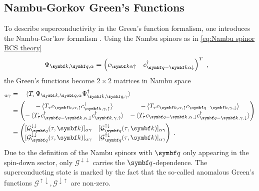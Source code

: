 \documentclass[../main.tex]{subfiles}
\begin{document}
\subsection*{Nambu-Gorkov Green's Functions}

To describe superconductivity in the Green's function formalism, one introduces the Nambu-Gor'kov formalism \cite{georgesDynamicalMeanfieldTheory1996}.
Using the Nambu spinors as in \cref{eq:Nambu spinor BCS theory}
\begin{align}
	\Psi_{\vb{k}, \vb{q}, \alpha} &= 
	\begin{pmatrix}
		c_{\vb{k} \alpha \uparrow} & 
		c_{\vb{q} -\vb{k} \alpha \downarrow}^{\dagger}
	\end{pmatrix}^{T} \;,
\end{align}
the Green's functions become \(2 \times 2\) matrices in Nambu space
\begin{align}
	[\mathcal{G}_{\vb{q}} (\tau, \vb{k})]_{\alpha \gamma} &= -\braket{T_{\tau} \Psi_{\vb{k}, \vb{q}, \alpha} \Psi_{\vb{k}, \vb{q}, \gamma}^{\dagger}} \\ 
	&= \begin{pmatrix}
		-\braket{T_{\tau} c_{\vb{k}, \alpha, \uparrow} c_{\vb{k}, \gamma, \uparrow}^{\dagger}} &
		-\braket{T_{\tau} c_{\vb{k}, \alpha, \uparrow} c_{\vb{q} - \vb{k}, \gamma, \downarrow}} \\
		-\braket{T_{\tau} c_{\vb{q} - \vb{k}, \alpha, \downarrow}^{\dagger} c_{\vb{k}, \gamma, \uparrow}^{\dagger}} &
		-\braket{T_{\tau} c_{\vb{q} - \vb{k}, \alpha, \downarrow} c_{\vb{q} - \vb{k}, \gamma, \downarrow}^{\dagger}}
	\end{pmatrix} \\
	&= \begin{pmatrix}
		[\mathcal{G}^{\downarrow \downarrow}_{\vb{q}} (\tau, \vb{k})]_{\alpha \gamma} & [\mathcal{G}^{\uparrow \downarrow}_{\vb{q}} (\tau, \vb{k})]_{\alpha \gamma} \\
		[\mathcal{G}^{\downarrow \downarrow}_{\vb{q}} (\tau, \vb{k})]_{\alpha \gamma} & [\mathcal{G}^{\uparrow \downarrow}_{\vb{q}} (\tau, \vb{k})]_{\alpha \gamma} \\
	\end{pmatrix} \;.
\end{align}
Due to the definition of the Nambu spinors with \(\vb{q}\) only appearing in the spin-down sector, only \(\mathcal{G}^{\downarrow \downarrow}\) carries the \(\vb{q}\)-dependence.
The superconducting state is marked by the fact that the so-called anomalous Green's functions \(\mathcal{G}^{\uparrow \downarrow}, \mathcal{G}^{\downarrow \uparrow}\) are non-zero.
\end{document}
